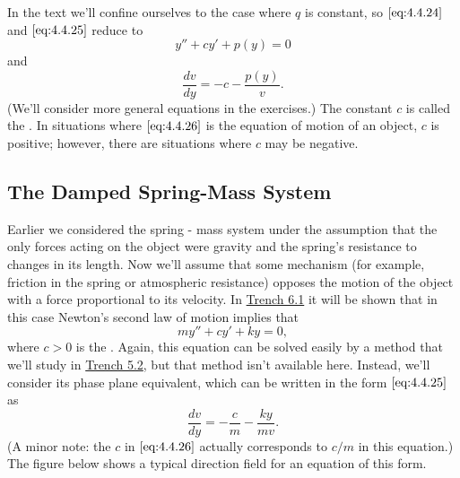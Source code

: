 \documentclass{ximera}
\begin{document}
In the text we'll confine ourselves to the case where $q$
is constant, so $\eqref{eq:4.4.24}$ and $\eqref{eq:4.4.25}$  reduce to
\begin{equation}\label{eq:4.4.26}
y''+cy'+p(y)=0
\end{equation}
and
$$
\frac{dv}{dy}=-c-\frac{p(y)}{v}.
$$
(We'll consider more general equations in the exercises.) The constant
$c$ is called the . In situations where
$\eqref{eq:4.4.26}$ is the equation of motion of an object, $c$ is positive;
however, there are situations where  $c$ may be negative.
 
\subsection*{The Damped Spring-Mass System}
 
Earlier we considered
the spring - mass system under the assumption that the only forces
acting on the object were gravity and the spring's resistance to
changes in its length. Now we'll assume that some mechanism (for
example, friction in the spring or atmospheric resistance) opposes the
motion of the object with a force proportional to its velocity. In \href{https://ximera.osu.edu/ode/main/springProblemsI/springProblemsI}{Trench 6.1} it will be shown that in this case Newton's
second law of motion implies that
\begin{equation}\label{eq:4.4.27}
my''+cy'+ky=0,
\end{equation}
where $c>0$ is the . Again, this
equation can
be solved easily by a method that we'll study in \href{https://ximera.osu.edu/ode/main/constantCoefficientHomogeneousEquations/constantCoefficientHomogeneousEquations}{Trench 5.2},
but that method isn't available here. Instead, we'll consider its
phase plane equivalent, which can be written in the form $\eqref{eq:4.4.25}$
as
\begin{equation}\label{eq:4.4.28}
\frac{dv}{dy}=-\frac{c}{m}-\frac{ky}{mv}.
\end{equation}
(A minor note: the $c$ in $\eqref{eq:4.4.26}$ actually corresponds to
$c/m$ in this equation.) The figure below shows a
typical direction field for an equation of this form.


\begin{center}
\end{center}

 
\end{document}
